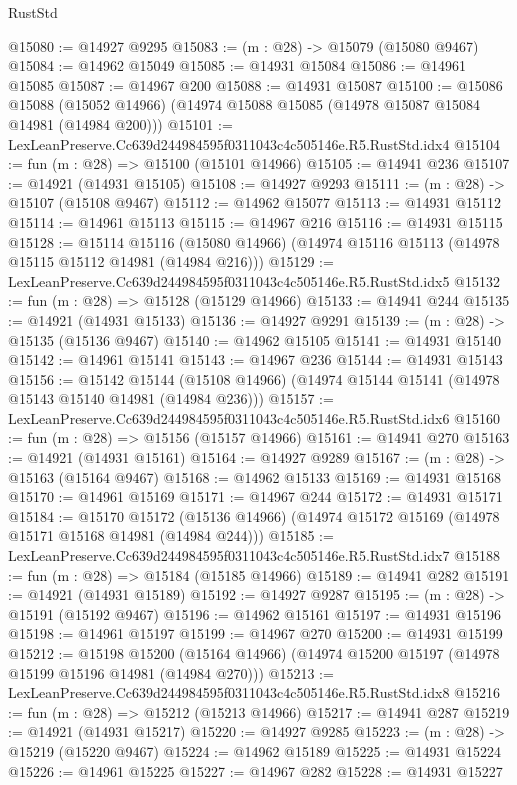 \begin{lexlean}{RustStd}
\begin{coremodule}
@15080 := @14927 @9295
@15083 := (m : @28) -> @15079 (@15080 @9467)
@15084 := @14962 @15049
@15085 := @14931 @15084
@15086 := @14961 @15085
@15087 := @14967 @200
@15088 := @14931 @15087
@15100 := @15086
    @15088
    (@15052 @14966)
    (@14974 @15088 @15085 (@14978 @15087 @15084 @14981 (@14984 @200)))
@15101 := LexLeanPreserve.Cc639d244984595f0311043c4c505146e.R5.RustStd.idx4
@15104 := fun (m : @28) => @15100 (@15101 @14966)
@15105 := @14941 @236
@15107 := @14921 (@14931 @15105)
@15108 := @14927 @9293
@15111 := (m : @28) -> @15107 (@15108 @9467)
@15112 := @14962 @15077
@15113 := @14931 @15112
@15114 := @14961 @15113
@15115 := @14967 @216
@15116 := @14931 @15115
@15128 := @15114
    @15116
    (@15080 @14966)
    (@14974 @15116 @15113 (@14978 @15115 @15112 @14981 (@14984 @216)))
@15129 := LexLeanPreserve.Cc639d244984595f0311043c4c505146e.R5.RustStd.idx5
@15132 := fun (m : @28) => @15128 (@15129 @14966)
@15133 := @14941 @244
@15135 := @14921 (@14931 @15133)
@15136 := @14927 @9291
@15139 := (m : @28) -> @15135 (@15136 @9467)
@15140 := @14962 @15105
@15141 := @14931 @15140
@15142 := @14961 @15141
@15143 := @14967 @236
@15144 := @14931 @15143
@15156 := @15142
    @15144
    (@15108 @14966)
    (@14974 @15144 @15141 (@14978 @15143 @15140 @14981 (@14984 @236)))
@15157 := LexLeanPreserve.Cc639d244984595f0311043c4c505146e.R5.RustStd.idx6
@15160 := fun (m : @28) => @15156 (@15157 @14966)
@15161 := @14941 @270
@15163 := @14921 (@14931 @15161)
@15164 := @14927 @9289
@15167 := (m : @28) -> @15163 (@15164 @9467)
@15168 := @14962 @15133
@15169 := @14931 @15168
@15170 := @14961 @15169
@15171 := @14967 @244
@15172 := @14931 @15171
@15184 := @15170
    @15172
    (@15136 @14966)
    (@14974 @15172 @15169 (@14978 @15171 @15168 @14981 (@14984 @244)))
@15185 := LexLeanPreserve.Cc639d244984595f0311043c4c505146e.R5.RustStd.idx7
@15188 := fun (m : @28) => @15184 (@15185 @14966)
@15189 := @14941 @282
@15191 := @14921 (@14931 @15189)
@15192 := @14927 @9287
@15195 := (m : @28) -> @15191 (@15192 @9467)
@15196 := @14962 @15161
@15197 := @14931 @15196
@15198 := @14961 @15197
@15199 := @14967 @270
@15200 := @14931 @15199
@15212 := @15198
    @15200
    (@15164 @14966)
    (@14974 @15200 @15197 (@14978 @15199 @15196 @14981 (@14984 @270)))
@15213 := LexLeanPreserve.Cc639d244984595f0311043c4c505146e.R5.RustStd.idx8
@15216 := fun (m : @28) => @15212 (@15213 @14966)
@15217 := @14941 @287
@15219 := @14921 (@14931 @15217)
@15220 := @14927 @9285
@15223 := (m : @28) -> @15219 (@15220 @9467)
@15224 := @14962 @15189
@15225 := @14931 @15224
@15226 := @14961 @15225
@15227 := @14967 @282
@15228 := @14931 @15227

\end{coremodule}
\end{lexlean}
